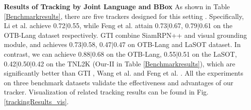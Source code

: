 \documentclass[final]{cvpr}
\begin{document}
\textbf{Results of Tracking by Joint Language and BBox}
As shown in Table \ref{Benchmarkresults}, there are five trackers designed for this setting \cite{li2017tracking, feng2020langTrackwacv, feng2019robust, yang2019grounding, wang2018describe}. Specifically, Li et al. \cite{li2017tracking} achieve 0.72$|$0.55, while Feng et al. \cite{feng2019robust, feng2020langTrackwacv} attain 0.73$|$0.67, 0.79$|$0.61 on the OTB-Lang dataset respectively. GTI \cite{yang2019grounding} combine SiamRPN++ and visual grounding module, and achieves 0.73$|$0.58, 0.47$|$0.47 on OTB-Lang and LaSOT dataset. In contrast, we can achieve 0.88$|$0.68 on the OTB-Lang, 0.55$|$0.51 on the LaSOT, 0.42$|$0.50$|$0.42 on the TNL2K (Our-II in Table \ref{Benchmarkresults}), which are significantly better than GTI \cite{yang2019grounding}, Wang et al. \cite{wang2018describe} and Feng et al. \cite{feng2020langTrackwacv}. All the experiments on three benchmark datasets validate the effectiveness and advantages of our tracker. Visualization of related tracking results can be found in Fig. \ref{trackingResults_vis}. 
\end{document}
